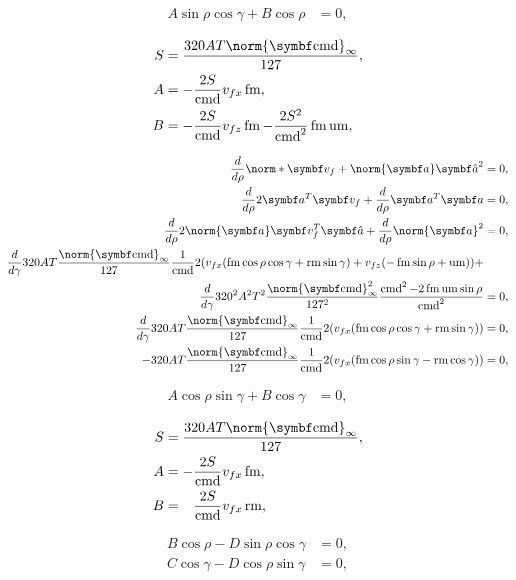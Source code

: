 \begin{align*}
A\sin\rho\cos\gamma + B\cos\rho &= 0,
\end{align*}

\begin{align*}
S &= \frac{320AT\norm{\vec{\cmd}}_{\infty}}{127},\\
A &= -\frac{2S}{\cmd}v_{fx}\fmove,\\
B &= -\frac{2S}{\cmd}v_{fz}\fmove - \frac{2S^2}{\cmd^2}\fmove\umove,
\end{align*}

\begin{align*}
\frac{d}{d\rho}\norm*{\vec{v}_f + \norm{\vec{a}}\uvec{a}}^2 &= 0,\\
\frac{d}{d\rho}2\vec{a}^T \vec{v}_f + \frac{d}{d\rho}\vec{a}^T \vec{a} &= 0,\\
\frac{d}{d\rho}2\norm{\vec{a}} \vec{v}_f^T \uvec{a} + \frac{d}{d\rho}\norm{\vec{a}}^2 &= 0,\\
\frac{d}{d\gamma}320AT\frac{\norm{\vec{\cmd}}_{\infty}}{127\hphantom{_{\infty}}} \frac{1}{\cmd}2 (v_{fx}(\fmove \cos\rho\cos\gamma + \rmove \sin\gamma) + v_{fz}(-\fmove \sin\rho + \umove) ) +\\
\frac{d}{d\gamma}320^2 A^2 T^2\frac{\norm{\vec{\cmd}}^2_{\infty}}{127^2\hphantom{_{\infty}}} \frac{\cmd^2  - 2\fmove\umove\sin\rho}{\cmd^2} &= 0,\\
%
\frac{d}{d\gamma}320AT\frac{\norm{\vec{\cmd}}_{\infty}}{127\hphantom{_{\infty}}} \frac{1}{\cmd}2 (v_{fx}(\fmove \cos\rho\cos\gamma + \rmove \sin\gamma)) &= 0,\\
-320AT\frac{\norm{\vec{\cmd}}_{\infty}}{127\hphantom{_{\infty}}} \frac{1}{\cmd}2 (v_{fx}(\fmove \cos\rho\sin\gamma - \rmove \cos\gamma)) &= 0,
\end{align*}

\begin{align*}
A\cos\rho\sin\gamma + B\cos\gamma &= 0,
\end{align*}

\begin{align*}
S &= \frac{320AT\norm{\vec{\cmd}}_{\infty}}{127},\\
A &= -\frac{2S}{\cmd}v_{fx}\fmove,\\
B &= \hphantom{-}\frac{2S}{\cmd}v_{fx}\rmove,
\end{align*}

\begin{align*}
B\cos\rho - D\sin\rho\cos\gamma &= 0,\\
C\cos\gamma - D\cos\rho\sin\gamma &= 0,
\end{align*}

